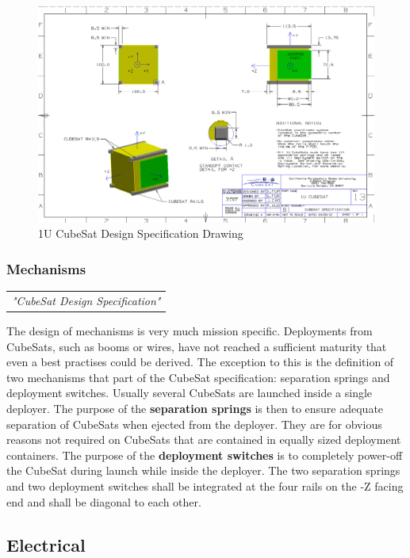 \begin{figure}[h]
\centering\includegraphics[scale=0.25]{fig/1u_cubesat_design_specification_drawing}
\caption{1U CubeSat Design Specification Drawing}
\label{fig:1U CubeSat Design Specification Drawing}
\end{figure}

\subsubsection{Mechanisms}

\begin{tabular}{l}
\textit{"CubeSat Design Specification" \cite{cubesat_design_specification}}
\end{tabular}

The design of mechanisms is very much mission specific. Deployments from CubeSats, such as booms or wires, have not reached a sufficient maturity that even a best practises could be derived. The exception to this is the definition of two mechanisms that part of the CubeSat specification: separation springs and deployment switches. Usually several CubeSats are launched inside a single deployer. The purpose of the \textbf{separation springs} is then to ensure adequate separation of CubeSats when ejected from the deployer. They are for obvious reasons not required on CubeSats that are contained in equally sized deployment containers. The purpose of the \textbf{deployment switches} is to completely power-off the CubeSat during launch while inside the deployer. The two separation springs and two deployment switches shall be integrated at the four rails on the -Z facing end and shall be diagonal to each other.  

\subsection{Electrical}


